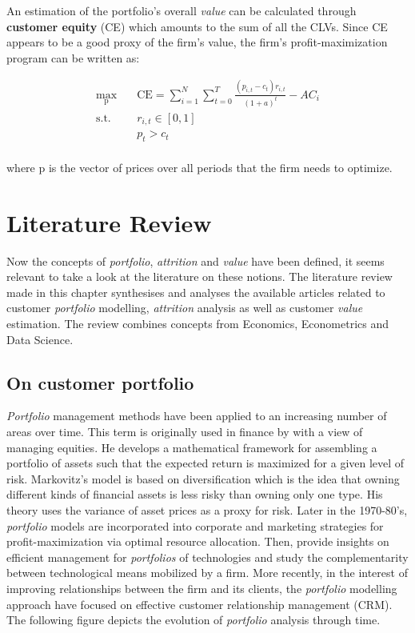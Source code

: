 \documentclass[
]{book}
\begin{document}
An estimation of the portfolio's overall \emph{value} can be calculated through \textbf{customer equity} (CE) which amounts to the sum of all the CLVs. Since CE appears to be a good proxy of the firm's value, the firm's profit-maximization program can be written as:

\begin{equation}
\begin{aligned}
\max_{\mathrm{p}} \quad & \textrm{CE} = \sum_{i=1}^{N} \sum_{t=0}^{T} \frac{(p_{i,t} - c_t)r_{i,t}}{(1+a)^t} - AC_i\\
\textrm{s.t.} \quad & r_{i,t} \in [0, 1]\\
  &p_t > c_t    \\
\end{aligned}
\label{eq:maxprofit}
\end{equation}

where \(\mathrm{p}\) is the vector of prices over all periods that the firm needs to optimize.

\hypertarget{literature}{%
\chapter{Literature Review}\label{literature}}

Now the concepts of \emph{portfolio}, \emph{attrition} and \emph{value} have been defined, it seems relevant to take a look at the literature on these notions. The literature review made in this chapter synthesises and analyses the available articles related to customer \emph{portfolio} modelling, \emph{attrition} analysis as well as customer \emph{value} estimation. The review combines concepts from Economics, Econometrics and Data Science.

\hypertarget{portfolio}{%
\section{On customer portfolio}\label{portfolio}}

\emph{Portfolio} management methods have been applied to an increasing number of areas over time. This term is originally used in finance by \citet{MARKOWITZ} with a view of managing equities. He develops a mathematical framework for assembling a portfolio of assets such that the expected return is maximized for a given level of risk. Markovitz's model is based on diversification which is the idea that owning different kinds of financial assets is less risky than owning only one type. His theory uses the variance of asset prices as a proxy for risk. Later in the 1970-80's, \emph{portfolio} models are incorporated into corporate \citep{WIND} and marketing \citep{DAY} strategies for profit-maximization via optimal resource allocation. Then, \citet{CAPON} provide insights on efficient management for \emph{portfolios} of technologies and study the complementarity between technological means mobilized by a firm. More recently, in the interest of improving relationships between the firm and its clients, the \emph{portfolio} modelling approach have focused on effective customer relationship management (CRM). The following figure depicts the evolution of \emph{portfolio} analysis through time.
\end{document}
